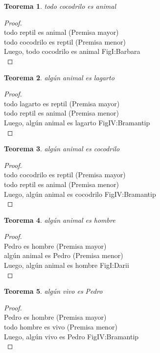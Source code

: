 ﻿\documentclass[12pt]{book}
\newtheorem{theorem}{Teorema}[chapter]
\newtheorem{proof}{Demostración}
\begin{document}
\begin{theorem}
todo cocodrilo es animal
\label{th: 31}
\end{theorem}\begin{proof}\\todo reptil es animal	 (Premisa mayor) \\todo cocodrilo es reptil	 (Premisa menor) \\Luego, todo cocodrilo es animal	FigI:Barbara \\ \end{proof}
\begin{theorem}
algún animal es lagarto
\label{th: 32}
\end{theorem}\begin{proof}\\todo lagarto es reptil	 (Premisa mayor) \\todo reptil es animal	 (Premisa menor) \\Luego, algún animal es lagarto	FigIV:Bramantip \\ \end{proof}
\begin{theorem}
algún animal es cocodrilo
\label{th: 33}
\end{theorem}\begin{proof}\\todo cocodrilo es reptil	 (Premisa mayor) \\todo reptil es animal	 (Premisa menor) \\Luego, algún animal es cocodrilo	FigIV:Bramantip \\ \end{proof}
\begin{theorem}
algún animal es hombre
\label{th: 34}
\end{theorem}\begin{proof}\\Pedro es hombre	 (Premisa mayor) \\algún animal es Pedro	 (Premisa menor) \\Luego, algún animal es hombre	FigI:Darii \\ \end{proof}
\begin{theorem}
algún vivo es Pedro
\label{th: 35}
\end{theorem}\begin{proof}\\Pedro es hombre	 (Premisa mayor) \\todo hombre es vivo	 (Premisa menor) \\Luego, algún vivo es Pedro	FigIV:Bramantip \\ \end{proof}
\end{document}
